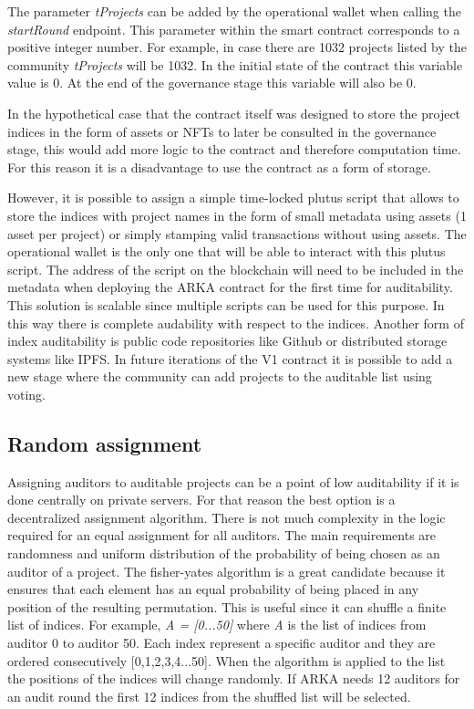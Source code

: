 \documentclass[12pt]{article}
\begin{document}
The parameter \emph{tProjects} can be added by the operational wallet when calling the \emph{startRound} endpoint. This parameter within the smart contract corresponds to a positive integer number. For example, in case there are 1032 projects listed by the community \emph{tProjects} will be 1032. In the initial state of the contract this variable value is 0. At the end of the governance stage this variable will also be 0.

In the hypothetical case that the contract itself was designed to store the project indices in the form of assets or NFTs to later be consulted in the governance stage, this would add more logic to the contract and therefore computation time. For this reason it is a disadvantage to use the contract as a form of storage.

However, it is possible to assign a simple time-locked plutus script that allows to store the indices with project names in the form of small metadata using assets (1 asset per project) or simply stamping valid transactions without using assets. The operational wallet is the only one that will be able to interact with this plutus script. The address of the script on the blockchain will need to be included in the metadata when deploying the ARKA contract for the first time for auditability. This solution is scalable since multiple scripts can be used for this purpose. In this way there is complete audability with respect to the indices. Another form of index auditability is public code repositories like Github or distributed storage systems like IPFS. In future iterations of the V1 contract it is possible to add a new stage where the community can add projects to the auditable list using voting.

\subsection { Random assignment }
   
Assigning auditors to auditable projects can be a point of low auditability if it is done centrally on private servers. For that reason the best option is a decentralized assignment algorithm. There is not much complexity in the logic required for an equal assignment for all auditors. The main requirements are randomness and uniform distribution of the probability of being chosen as an auditor of a project. The fisher-yates algorithm is a great candidate because it ensures that each element has an equal probability of being placed in any position of the resulting permutation. This is useful since it can shuffle a finite list of indices. For example, \emph {A = [0...50]} where \emph {A} is the list of indices from auditor 0 to auditor 50. Each index represent a specific auditor and they are ordered consecutively [0,1,2,3,4...50]. When the algorithm is applied to the list the positions of the indices will change randomly. If ARKA needs 12 auditors for an audit round the first 12 indices from the shuffled list will be selected.\\
\end{document}
